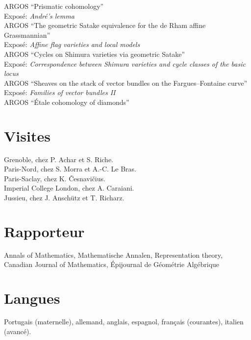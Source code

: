 \documentclass[12pt]{article} %
\begin{document}
 ARGOS ``Prismatic cohomology''\\
Exposé: {\it André's lemma} \\

 ARGOS ``The geometric Satake equivalence for the de Rham affine Grassmannian''\\
Exposé: {\it Affine flag varieties and local models} \\

 ARGOS ``Cycles on Shimura varieties via geometric Satake''\\
Exposé: {\it Correspondence between Shimura varieties and cycle classes of the basic locus} \\

 ARGOS ``Sheaves on the stack of vector bundles on the Fargues--Fontaine curve''\\
Exposé: {\it Families of vector bundles II}\\

 ARGOS ``Étale cohomology of diamonds''
\fi

\section*{Visites}
Grenoble, chez P. Achar et S. Riche.\\
 
 Paris-Nord, chez S. Morra et A.-C. Le Bras. \\

 Paris-Saclay, chez K. \v{C}esnavi\v{c}ius. \\

 Imperial College London, chez A. Caraiani.\\

 Jussieu, chez J. Anschütz et T. Richarz.
\section*{Rapporteur}
Annals of Mathematics, Mathematische Annalen, Representation theory, Canadian Journal of Mathematics, Épijournal de Géométrie Algébrique

\section*{Langues}
Portugais (maternelle), allemand, anglais, espagnol, français (courantes), italien (avancé).
\end{document}
